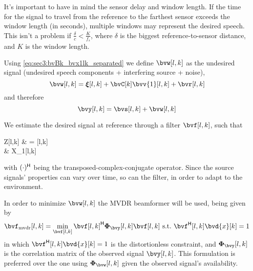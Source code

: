 It's important to have in mind the sensor delay and window length. If the time for the signal to travel from the reference to the farthest sensor exceeds the window length (in seconds), multiple windows may represent the desired speech. This isn't a problem if $\frac{\delta}{c} < \frac{K}{f_s}$, where $\delta$ is the biggest reference-to-sensor distance, and $K$ is the window length.

Using \cref{eq:sec3:bvBk_bvx1lk_separated} we define $\bvw[l,k]$ as the undesired signal (undesired speech components + interfering source + noise),
\begin{equation}
	\label{eq:sec3:def_undes_sig_bvwlk}
	\bvw[l,k] = \bvxi[l,k] + \bvC[k] \bvv{1}[l,k] + \bvr[l,k]
\end{equation}
and therefore
\begin{equation}
    \label{eq:sec3:time-freq_model_final}
	\bvy[l,k] = \bvs[l,k] + \bvw[l,k]
\end{equation}


We estimate the desired signal at reference through a filter $\bvf[l,k]$, such that
\begin{equations}
	Z[l,k]
	& = \he{\bvf}[l,k] \bvy[l,k] \\
	& \approx X_1[l,k]
\end{equations}
with $(\cdot)^{\mathsf{H}}$ being the transposed-complex-conjugate operator. Since the source signals' properties can vary over time, so can the filter, in order to adapt to the environment.

In order to minimize $\bvw[l,k]$ the MVDR beamformer \cite{erdogan_improved_2016} will be used, being given by
\begin{equation}
	\label{eq:sec3:minimization_problem_mvdr}
	\bvf_{\mvdr}[l,k] = \min_{\bvf[l,k]} \he{\bvf[l,k]} \Corr{\bvy}[l,k] \bvf[l,k]~\text{s.t.}~\he{\bvf}[l,k] \bvd{x}[k] = 1
\end{equation}
in which $\he{\bvf}[l,k] \bvd{x}[k] = 1$ is the distortionless constraint, and $\Corr{\bvy}[l,k]$ is the correlation matrix of the observed signal $\bvy[l,k]$. This formulation is preferred over the one using $\Corr{\bvw}[l,k]$ given the observed signal's availability.

